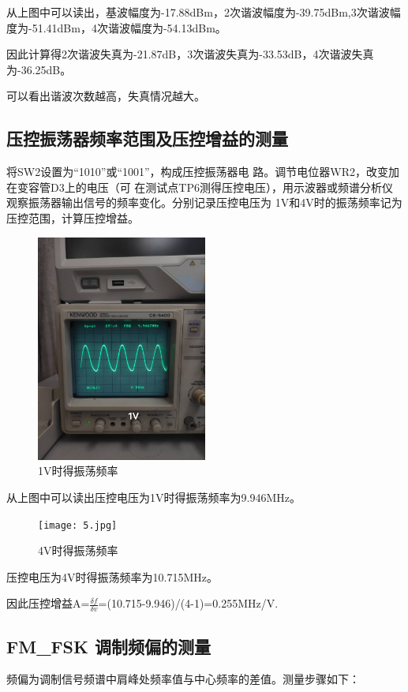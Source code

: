 \documentclass{../source/Experiment}
\begin{document}
从上图中可以读出，基波幅度为-17.88dBm，2次谐波幅度为-39.75dBm,3次谐波幅度为-51.41dBm，4次谐波幅度为-54.13dBm。

因此计算得2次谐波失真为-21.87dB，3次谐波失真为-33.53dB，4次谐波失真为-36.25dB。

可以看出谐波次数越高，失真情况越大。

\subsection{压控振荡器频率范围及压控增益的测量}

将SW2设置为“1010”或“1001”，构成压控振荡器电
路。调节电位器WR2，改变加在变容管D3上的电压（可
在测试点TP6测得压控电压），用示波器或频谱分析仪
观察振荡器输出信号的频率变化。分别记录压控电压为
1V和4V时的振荡频率记为压控范围，计算压控增益。
\begin{figure}[H]
    \centering
    \includegraphics[width = 0.5\textwidth]{lab3/4.jpg}
    \caption{1V时得振荡频率}
\end{figure}
从上图中可以读出压控电压为1V时得振荡频率为9.946MHz。

\begin{figure}[H]
    \centering
    \texttt{[image: 5.jpg]}
    \caption{4V时得振荡频率}
\end{figure}
压控电压为4V时得振荡频率为10.715MHz。

因此压控增益A=$\frac{\delta f}{\delta v}$=(10.715-9.946)/(4-1)=0.255MHz/V.

\subsection{FM\_FSK 调制频偏的测量}

频偏为调制信号频谱中肩峰处频率值与中心频率的差值。测量步骤如下：
\end{document}
